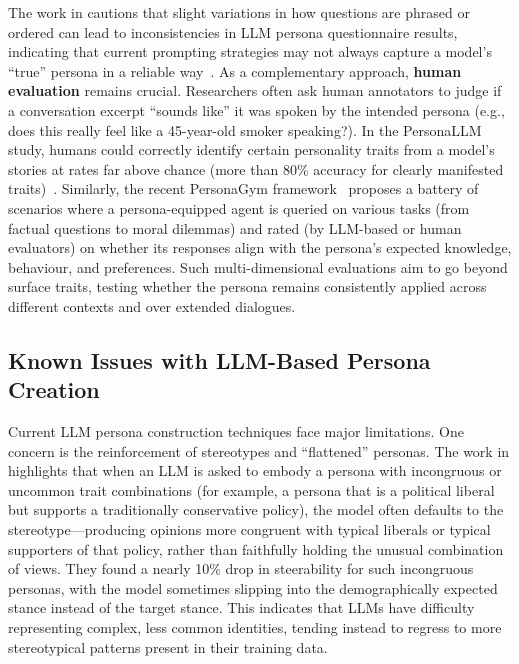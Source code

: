 The work in \citet{shu-etal-2024-personality-tests} cautions that slight variations in how questions are phrased or ordered can lead to inconsistencies in LLM persona questionnaire results, indicating that current prompting strategies may not always capture a model's ``true'' persona in a reliable way~\cite{shu-etal-2024-personality-tests}. As a complementary approach, \textbf{human evaluation} remains crucial. Researchers often ask human annotators to judge if a conversation excerpt ``sounds like'' it was spoken by the intended persona (e.g., does this really feel like a 45-year-old smoker speaking?). In the PersonaLLM study, humans could correctly identify certain personality traits from a model's stories at rates far above chance (more than 80\% accuracy for clearly manifested traits)~\cite{jiang-etal-2023-personallm}. Similarly, the recent PersonaGym framework~\cite{samuel2025personagymevaluatingpersonaagents} proposes a battery of scenarios where a persona-equipped agent is queried on various tasks (from factual questions to moral dilemmas) and rated (by LLM-based or human evaluators) on whether its responses align with the persona's expected knowledge, behaviour, and preferences. Such multi-dimensional evaluations aim to go beyond surface traits, testing whether the persona remains consistently applied across different contexts and over extended dialogues.


\subsection*{Known Issues with LLM-Based Persona Creation}
Current LLM persona construction techniques face major limitations. One concern is the reinforcement of stereotypes and ``flattened'' personas. The work in \citet{liu-etal-2024-evaluating-large} highlights that when an LLM is asked to embody a persona with incongruous or uncommon trait combinations (for example, a persona that is a political liberal but supports a traditionally conservative policy), the model often defaults to the stereotype---producing opinions more congruent with typical liberals or typical supporters of that policy, rather than faithfully holding the unusual combination of views. They found a nearly 10\% drop in steerability for such incongruous personas, with the model sometimes slipping into the demographically expected stance instead of the target stance. This indicates that LLMs have difficulty representing complex, less common identities, tending instead to regress to more stereotypical patterns present in their training data.

